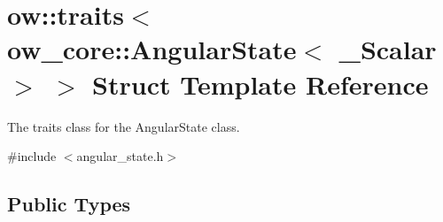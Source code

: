 \hypertarget{structow_1_1traits_3_01ow__core_1_1AngularState_3_01__Scalar_01_4_01_4}{}\section{ow\+:\+:traits$<$ ow\+\_\+core\+:\+:Angular\+State$<$ \+\_\+\+Scalar $>$ $>$ Struct Template Reference}
\label{structow_1_1traits_3_01ow__core_1_1AngularState_3_01__Scalar_01_4_01_4}


The traits class for the Angular\+State class.  




{\ttfamily \#include $<$angular\+\_\+state.\+h$>$}

\subsection*{Public Types}
